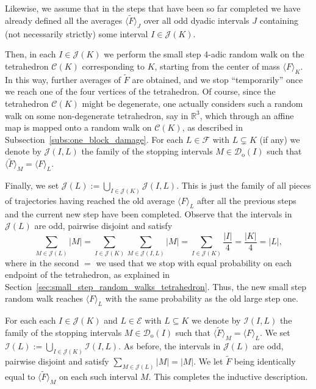 \documentclass{amsart}
\newcommand{\R}{\mathbb{R}}
\newcommand{\cD}{\mathcal{D}}
\newcommand{\wt}{\widetilde}
\theoremstyle{definition}
\theoremstyle{remark}
\begin{document}
Likewise, we assume that in the steps that have been so far completed we have already defined all the averages $\langle\wt{F}\rangle_{J}$ over all odd dyadic intervals $J$ containing (not necessarily strictly) some interval $I\in\mathscr{J}(K)$.

Then, in each $I\in\mathscr{J}(K)$ we perform the small step 4-adic random walk on the tetrahedron $\mathscr{C}(K)$ corresponding to $K$, starting from the center of mass $\langle F\rangle_{K}$. In this way, further averages of $\wt{F}$ are obtained, and we stop ``temporarily'' once we reach one of the four vertices of the tetrahedron. Of course, since the tetrahedron $\mathscr{C}(K)$ might be degenerate, one actually considers such a random walk on some non-degenerate tetrahedron, say in $\R^3$, which through an affine map is mapped onto a random walk on $\mathscr{C}(K)$, as described in Subsection~\ref{subs:one_block_damage}. For each $L\in\mathscr{F}$ with $L\subsetneq K$ (if any) we denote by $\mathscr{J}(I,L)$ the family of the stopping intervals $M\in\cD_{\mathrm{o}}(I)$ such that $\langle\wt{F}\rangle_{M}=\langle F\rangle_{L}$.

Finally, we set $\mathscr{J}(L):=\bigcup_{I\in\mathscr{J}(K)}\mathscr{J}(I,L)$. This is just the family of all pieces of trajectories having reached the old average $\langle F\rangle_{L}$ after all the previous steps and the current new step have been completed. Observe that the intervals in $\mathscr{J}(L)$ are odd, pairwise disjoint and satisfy
\begin{equation*}
    \sum_{M\in\mathscr{J}(L)}|M|=\sum_{I\in\mathscr{J}(K)}\sum_{M\in\mathscr{J}(I,L)}|M|=\sum_{I\in\mathscr{J}(K)}\frac{|I|}{4}=\frac{|K|}{4}=|L|,
\end{equation*}
where in the second $=$ we used that we stop with equal probability on each endpoint of the tetrahedron, as explained in Section~\ref{sec:small_step_random_walks_tetrahedron}. Thus, the new small step random walk reaches $\langle F\rangle_{L}$ with the same probability as the old large step one.

For each each $I\in\mathscr{J}(K)$ and $L\in\mathscr{E}$ with $L\subseteq K$ we denote by $\mathscr{I}(I,L)$ the family of the stopping intervals $M\in\cD_{\mathrm{o}}(I)$ such that $\langle\wt{F}\rangle_{M}=\langle F\rangle_{L}$. We set $\mathscr{I}(L):=\bigcup_{I\in\mathscr{J}(K)}\mathscr{I}(I,L)$. As before, the intervals in $\mathscr{J}(L)$ are odd, pairwise disjoint and satisfy $\sum_{M\in\mathscr{J}(L)}|M|=|M|$. We let $\wt{F}$ being identically equal to $\langle\wt{F}\rangle_{M}$ on each such interval $M$. This completes the inductive description.
\end{document}
